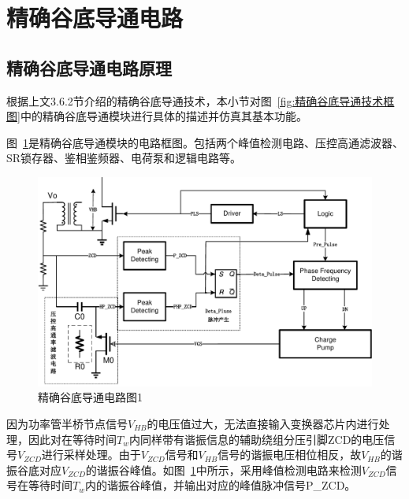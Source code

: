


\section{精确谷底导通电路}

\subsection{精确谷底导通电路原理}

根据上文3.6.2节介绍的精确谷底导通技术，本小节对图~\ref{fig:精确谷底导通技术框图}中的精确谷底导通模块进行具体的描述并仿真其基本功能。

图~\ref{fig:精确谷底导通电路图1}是精确谷底导通模块的电路框图。包括两个峰值检测电路、压控高通滤波器、SR锁存器、鉴相鉴频器、电荷泵和逻辑电路等。

\begin{figure}[htbp] 
    \centering
    \includegraphics[width=0.8\linewidth]{figures/精确谷底导通电路图1.pdf}
    \caption{精确谷底导通电路图1}
    \label{fig:精确谷底导通电路图1}
\end{figure}


因为功率管半桥节点信号$V_{HB}$的电压值过大，无法直接输入变换器芯片内进行处理，因此对在等待时间$T_w$内同样带有谐振信息的辅助绕组分压引脚ZCD的电压信号$V_{ZCD}$进行采样处理。由于$V_{ZCD}$信号和$V_{HB}$信号的谐振电压相位相反，故$V_{HB}$的谐振谷底对应$V_{ZCD}$的谐振谷峰值。如图~\ref{fig:精确谷底导通电路图1}中所示，采用峰值检测电路来检测$V_{ZCD}$信号在等待时间$T_w$内的谐振谷峰值，并输出对应的峰值脉冲信号P\_ZCD。

